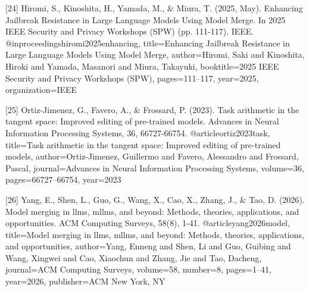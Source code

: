 \documentclass{article}
\begin{document}
{[24] Hiromi, S., Kinoshita, H., Yamada, M., & Miura, T. (2025, May). Enhancing Jailbreak Resistance in Large Language Models Using Model Merge. In 2025 IEEE Security and Privacy Workshops (SPW) (pp. 111-117). IEEE.
@inproceedings{hiromi2025enhancing,
  title={Enhancing Jailbreak Resistance in Large Language Models Using Model Merge},
  author={Hiromi, Saki and Kinoshita, Hiroki and Yamada, Masanori and Miura, Takayuki},
  booktitle={2025 IEEE Security and Privacy Workshops (SPW)},
  pages={111--117},
  year={2025},
  organization={IEEE}
}

[25] Ortiz-Jimenez, G., Favero, A., & Frossard, P. (2023). Task arithmetic in the tangent space: Improved editing of pre-trained models. Advances in Neural Information Processing Systems, 36, 66727-66754.
@article{ortiz2023task,
  title={Task arithmetic in the tangent space: Improved editing of pre-trained models},
  author={Ortiz-Jimenez, Guillermo and Favero, Alessandro and Frossard, Pascal},
  journal={Advances in Neural Information Processing Systems},
  volume={36},
  pages={66727--66754},
  year={2023}
}

[26] Yang, E., Shen, L., Guo, G., Wang, X., Cao, X., Zhang, J., & Tao, D. (2026). Model merging in llms, mllms, and beyond: Methods, theories, applications, and opportunities. ACM Computing Surveys, 58(8), 1-41.
@article{yang2026model,
  title={Model merging in llms, mllms, and beyond: Methods, theories, applications, and opportunities},
  author={Yang, Enneng and Shen, Li and Guo, Guibing and Wang, Xingwei and Cao, Xiaochun and Zhang, Jie and Tao, Dacheng},
  journal={ACM Computing Surveys},
  volume={58},
  number={8},
  pages={1--41},
  year={2026},
  publisher={ACM New York, NY}
}



}
\end{document}
